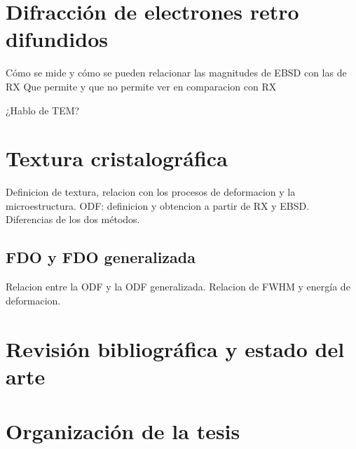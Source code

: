 \section{Difracción de electrones retro difundidos}\label{S:EBSD}
Cómo se mide y cómo se pueden relacionar las magnitudes de EBSD con las de RX
Que permite y que no permite ver en comparacion con RX

¿Hablo de TEM?
 
\section{Textura cristalográfica}\label{S:Text}
Definicion de textura, relacion con los procesos de deformacion y la microestructura.
ODF: definicion y obtencion a partir de RX y EBSD. Diferencias de los dos métodos.

\subsection{FDO y FDO generalizada}\label{SS:ODF}
Relacion entre la ODF y la ODF generalizada. Relacion de FWHM y energía de deformacion.

\section{Revisión bibliográfica y estado del arte}\label{S:RB}

\section{Organización de la tesis}\label{S:Org}

